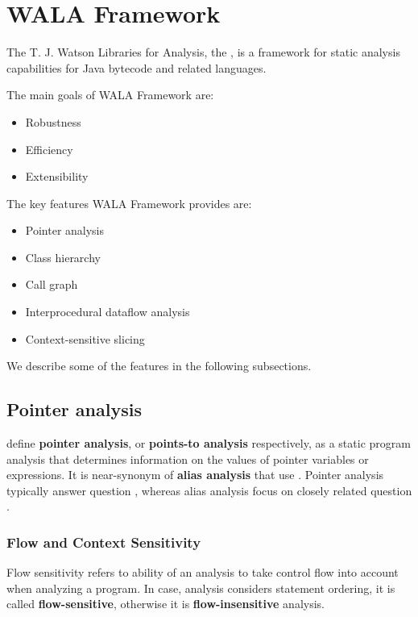 \section{WALA Framework \label{chapter:analysis:wala}}

The T. J. Watson Libraries for Analysis, the \citet{WalaFramework},
is a framework for static analysis capabilities for Java
bytecode and related languages.

The main goals of WALA Framework are:
\begin{itemize}
  \item Robustness
  \item Efficiency
  \item Extensibility
\end{itemize}

The key features WALA Framework provides are:
\begin{itemize}
  \item Pointer analysis
  \item Class hierarchy
  \item Call graph
  \item Interprocedural dataflow analysis
  \item Context-sensitive slicing
\end{itemize}

We describe some of the features in the following subsections.



\subsection{Pointer analysis}

\citet{PointerAnalysis} define \textbf{pointer analysis},
or \textbf{points-to analysis} respectively, as a static program analysis that
determines information on the values of pointer variables or expressions.
It is near-synonym of \textbf{alias analysis} that use \citet{AliasAnalysis}.
Pointer analysis typically answer question
,
whereas alias analysis focus on closely related question
.




\subsubsection{Flow and Context Sensitivity}

Flow sensitivity refers to ability of an analysis to take control flow
into account when analyzing a program.
In case, analysis considers statement ordering, it is called \textbf{flow-sensitive},
otherwise it is \textbf{flow-insensitive} analysis.

